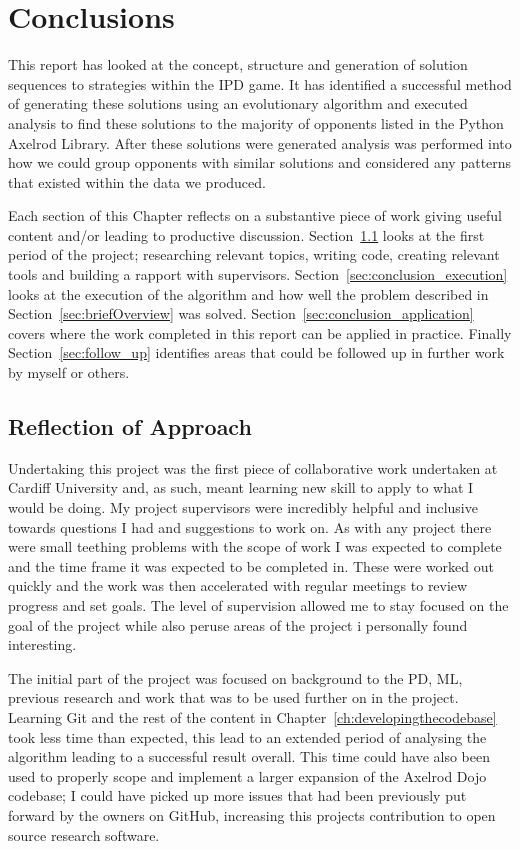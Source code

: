 \chapter{Conclusions}\label{ch:conclusions}
This report has looked at the concept, structure and generation of solution sequences to strategies within the IPD game. 
It has identified a successful method of generating these solutions using an evolutionary algorithm and executed analysis to find these solutions to the majority of opponents listed in the Python Axelrod Library. 
After these solutions were generated analysis was performed into how we could group opponents with similar solutions and considered any patterns that existed within the data we produced.

Each section of this Chapter reflects on a substantive piece of work giving useful content and/or leading to productive discussion.
Section~\ref{sec:conclusion_approach} looks at the first period of the project; researching relevant topics,  writing code, creating relevant tools and building a rapport with supervisors.
Section~\ref{sec:conclusion_execution} looks at the execution of the algorithm and how well the problem described in Section~\ref{sec:briefOverview} was solved.
Section~\ref{sec:conclusion_application} covers where the work completed in this report can be applied in practice.
Finally Section~\ref{sec:follow_up} identifies areas that could be followed up in further work by myself or others.

\section{Reflection of Approach}\label{sec:conclusion_approach}
Undertaking this project was the first piece of collaborative work undertaken at Cardiff University and, as such, meant learning new skill to apply to what I would be doing.
My project supervisors were incredibly helpful and inclusive towards questions I had and suggestions to work on.
As with any project there were small teething problems with the scope of work I was expected to complete and the time frame it was expected to be completed in.
These were worked out quickly and the work was then accelerated with regular meetings to review progress and set goals.
The level of supervision allowed me to stay focused on the goal of the project while also peruse areas of the project i personally found interesting.

The initial part of the project was focused on background to the PD, ML, previous research and work that was to be used further on in the project. 
Learning Git and the rest of the content in Chapter~\ref{ch:developingthecodebase} took less time than expected, this lead to an extended period of analysing the algorithm leading to a successful result overall. 
This time could have also been used to properly scope and implement a larger expansion of the Axelrod Dojo codebase; I could have picked up more issues that had been previously put forward by the owners on GitHub, increasing this projects contribution to open source research software.

